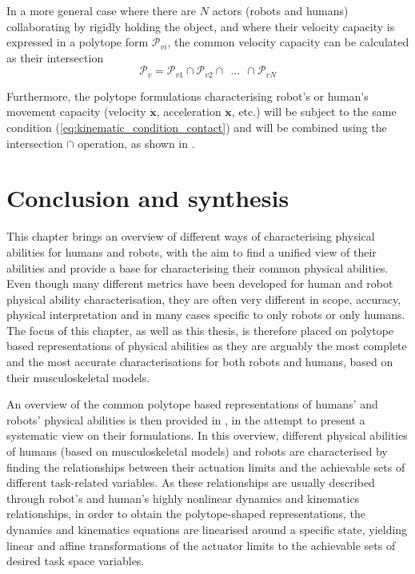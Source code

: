 In a more general case where there are $N$ actors (robots and humans) collaborating by rigidly holding the object, and where their velocity capacity is expressed in a polytope form $\mathcal{P}_{vi}$, the common velocity capacity can be calculated as their intersection
\begin{equation}
    \mathcal{P}_v =  \mathcal{P}_{v1} \cap \mathcal{P}_{v2} \cap ~~ \ldots ~~\cap \mathcal{P}_{vN}
\end{equation}

Furthermore, the polytope formulations characterising robot's or human's movement capacity (velocity $\dot{\bm{x}}$, acceleration $\ddot{\bm{x}}$, etc.) will be subject to the same condition (\ref{eq:kinematic_condition_contact}) and will be combined using the intersection $\cap$ operation, as shown in .

\section{Conclusion and synthesis}
\label{ch:collab_metrics_overview}

This chapter brings an overview of different ways of characterising physical abilities for humans and robots, with the aim to find a unified view of their abilities and provide a base for characterising their common physical abilities. Even though many different metrics have been developed for human and robot physical ability characterisation, they are often very different in scope, accuracy, physical interpretation and in many cases specific to only robots or only humans. The focus of this chapter, as well as this thesis, is therefore placed on polytope based representations of physical abilities as they are arguably the most complete and the most accurate characterisations for both robots and humans, based on their musculoskeletal models.

An overview of the common polytope based representations of humans' and robots' physical abilities is then provided in , in the attempt to present a systematic view on their formulations. In this overview, different physical abilities of humans (based on musculoskeletal models) and robots are characterised by finding the relationships between their actuation limits and the achievable sets of different task-related variables. As these relationships are usually described through robot's and human's highly nonlinear dynamics and kinematics relationships, in order to obtain the polytope-shaped representations, the dynamics and kinematics equations are linearised around a specific state, yielding linear and affine transformations of the actuator limits to the achievable sets of desired task space variables.

